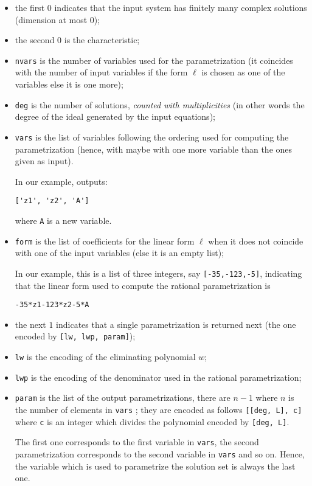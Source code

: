\documentclass[a4paper,english,11pt]{scrartcl}
\theoremstyle{definition}
\theoremstyle{remark}
\begin{document}
\begin{itemize}
\item the first $0$ indicates that the input system has finitely
  many complex solutions (dimension at most $0$);
\item the second $0$ is the characteristic;
\item \verb+nvars+ is the number of variables used for the parametrization (it
  coincides with the number of input variables if the form $\ell$ is chosen
  as one of the variables else it is one more);
\item \verb+deg+ is the number of solutions, \emph{counted with multiplicities}
  (in other words the degree of the ideal generated by the input equations);
\item \verb+vars+ is the list of variables following the ordering used for
  computing the parametrization (hence, with maybe with one
  more variable than the ones given as input).

  In our example, \msolve outputs:
\begin{verbatim}
['z1', 'z2', 'A']
\end{verbatim}
where \verb+A+ is a new variable. 

\item \texttt{form} is the list of coefficients for the linear form $\ell$ when
  it does not coincide with one of the input variables (else it is an empty list);

  In our example, this is a list of three integers, say \verb+[-35,-123,-5]+, 
  indicating that the linear form used to compute the rational parametrization is 
\begin{verbatim}
-35*z1-123*z2-5*A
\end{verbatim}
\item the next $1$ indicates that a single parametrization is returned next (the one encoded by \verb+[lw, lwp, param]+);
\item \verb+lw+ is the encoding of the eliminating polynomial $w$;
\item \verb+lwp+ is the encoding of the denominator used in the rational
  parametrization;
\item \verb+param+ is the list of the output parametrizations, there are $n-1$ where 
    $n$ is the number of elements in \verb+vars+ ; 
    they are encoded as follows \verb+[[deg, L], c]+ where \verb+c+ is 
    an integer which divides the polynomial encoded by \verb+[deg, L]+. 

    The first one corresponds to the first variable in \verb+vars+, the 
    second parametrization corresponds to the second variable in \verb+vars+ 
    and so on. Hence, the variable which is used to parametrize the solution 
    set is always the last one.
\end{itemize}
\end{document}
